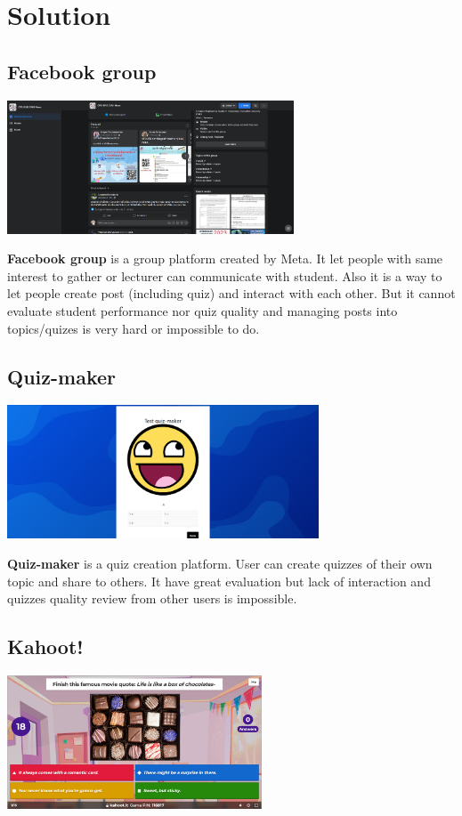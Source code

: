 \documentclass[ 10pt]{report}
\begin{document}
    \pagebreak
    \section{Solution}

    \subsection{Facebook group}
    \begin{center}
        \includegraphics[height=150px]{facebook_group.png}
    \end{center}

    \textbf{Facebook group} is a group platform created by Meta. It let people with same interest to gather or lecturer can communicate with student. Also it is a way to let people create post (including quiz) and interact with each other. But it cannot evaluate student performance nor quiz quality and managing posts into topics/quizes is very hard or impossible to do.

    \subsection{Quiz-maker}
    \begin{center}
        \includegraphics[height=150px]{quiz-maker.png}
    \end{center}
    
    \textbf{Quiz-maker} is a quiz creation platform. User can create quizzes of their own topic and share to others. It have great evaluation but lack of interaction and quizzes quality review from other users is impossible.
    
    
    \subsection{Kahoot!}
    \begin{center}
        \includegraphics[height=150px]{kahoot.png}
    \end{center}
    
\end{document}
